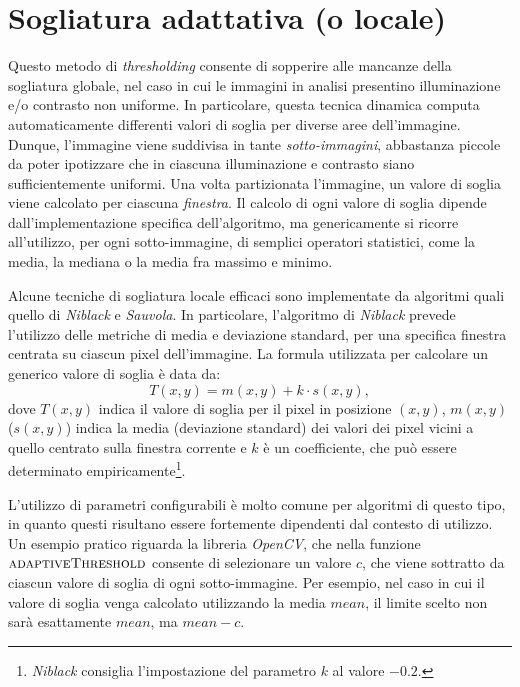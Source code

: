 \section{Sogliatura adattativa (o locale)}
\label{sec:image-bin-local}
Questo metodo di \textit{thresholding} consente di sopperire alle mancanze della sogliatura globale, nel caso in cui le immagini in analisi presentino illuminazione e/o contrasto non uniforme. In particolare, questa tecnica dinamica computa automaticamente differenti valori di soglia per diverse aree dell'immagine. Dunque, l'immagine viene suddivisa in tante \textit{sotto-immagini}, abbastanza piccole da poter ipotizzare che in ciascuna illuminazione e contrasto siano sufficientemente uniformi. Una volta partizionata l'immagine, un valore di soglia viene calcolato per ciascuna \textit{finestra}. Il calcolo di ogni valore di soglia dipende dall'implementazione specifica dell'algoritmo, ma genericamente si ricorre all'utilizzo, per ogni sotto-immagine, di semplici operatori statistici, come la media, la mediana o la media fra massimo e minimo.\par
Alcune tecniche di sogliatura locale efficaci sono implementate da algoritmi quali quello di \textit{Niblack}\cite{bib:niblack} e \textit{Sauvola}\cite{bib:sauvola}. In particolare, l'algoritmo di \textit{Niblack} prevede l'utilizzo delle metriche di media e deviazione standard, per una specifica finestra centrata su ciascun pixel dell'immagine. La formula utilizzata per calcolare un generico valore di soglia \`e data da:
\begin{equation}
	\label{eq:niblack}
	T(x, y) = m(x, y) + k \cdot s(x, y),
\end{equation}
dove $T(x, y)$ indica il valore di soglia per il pixel in posizione $(x, y)$, $m(x, y)$ ($s(x, y)$) indica la media (deviazione standard) dei valori dei pixel vicini a quello centrato sulla finestra corrente e $k$ \`e un coefficiente, che pu\`o essere determinato empiricamente\footnote{\textit{Niblack} consiglia l'impostazione del parametro $k$ al valore $-0.2$.}.\par
L'utilizzo di parametri configurabili \`e molto comune per algoritmi di questo tipo, in quanto questi risultano essere fortemente dipendenti dal contesto di utilizzo. Un esempio pratico riguarda la libreria \textit{OpenCV}, che nella funzione $\textproc{adaptiveThreshold}$ consente di selezionare un valore $c$, che viene sottratto da ciascun valore di soglia di ogni sotto-immagine. Per esempio, nel caso in cui il valore di soglia venga calcolato utilizzando la media $mean$, il limite scelto non sar\`a esattamente $mean$, ma $mean - c$.\par
